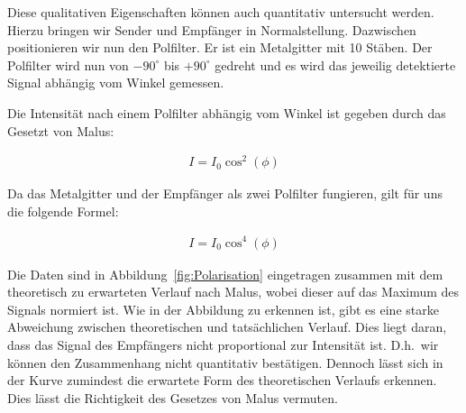\documentclass[a4paper,10pt,twocolumn]{article}
\begin{document}
    Diese qualitativen Eigenschaften können auch quantitativ untersucht werden.
    Hierzu bringen wir Sender und Empfänger in Normalstellung.
    Dazwischen positionieren wir nun den Polfilter.
    Er ist ein Metalgitter mit 10 Stäben.
    Der Polfilter wird nun von $-90^\circ$ bis $+90^\circ$ gedreht und es wird das jeweilig detektierte Signal
    abhängig vom Winkel gemessen.
    
    Die Intensität nach einem Polfilter abhängig vom Winkel ist gegeben durch das Gesetzt von Malus:
    
    \begin{align}
        I = I_0 \cos^2(\phi)
    \end{align}
    
    Da das Metalgitter und der Empfänger als zwei Polfilter fungieren, gilt für uns die folgende Formel:
    
    \begin{align}
        \label{eq:cos4}
        I = I_0 \cos^4( \phi )
    \end{align}
    
    
    Die Daten sind in Abbildung~\ref{fig:Polarisation} eingetragen zusammen mit dem theoretisch zu erwarteten
    Verlauf nach Malus, wobei dieser auf das Maximum des Signals normiert ist.
    Wie in der Abbildung zu erkennen ist, gibt es eine starke Abweichung zwischen theoretischen und tatsächlichen
    Verlauf.
    Dies liegt daran, dass das Signal des Empfängers nicht proportional zur Intensität ist.
    D.h.\ wir können den Zusammenhang nicht quantitativ bestätigen.
    Dennoch lässt sich in der Kurve zumindest die erwartete Form des theoretischen Verlaufs erkennen.
    Dies lässt die Richtigkeit des Gesetzes von Malus vermuten.
    
\end{document}
